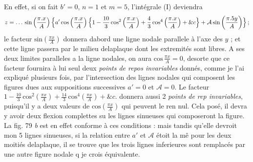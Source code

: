 \documentclass[11pt,a4paper]{article}
\begin{document}
En effet, si on fait $b'=0$, $n=1$ et $m=5$, l'intégrale (I) deviendra
\[
z=\ldots\,\text{sin}\left(\frac{\pi.x}{A}\right)\Bigl\{a'\,\text{cos}\left(\frac{\pi.x}{A}\right)\Bigl\{1-\frac{10}{3}\,\text{cos}^2\left(\frac{\pi.x}{A}\right)+\frac{4}{3}\,\text{cos}^4\left(\frac{\pi.x}{A}\right)+\&c\Bigr\}+\mathcal{A}\,\text{sin}\left(\frac{\pi.5y}{A}\right)\Bigr\}\,;
\]
le facteur $\text{sin}\left(\frac{\pi x}{A}\right)$ donnera dabord une ligne nodale parallele à l'axe
des $y$ ; et cette ligne passera par le milieu delaplaque dont les
extremités sont libres. A ses deux limites paralleles a la ligne nodales,
on aura $\text{cos}\,\frac{\pi x}{A}=0$, desorte que ce facteur fournira à lui seul
deux \emph{points de repos invariables} donnés, comme je l'ai expliqué
plusieurs fois, par l'intersection des lignes nodales qui composent
les figures dues aux suppositions successives $a'=0$ et $\mathcal{A}=0$. Le
facteur $1-\frac{10}{3}\,\text{cos}^2\left(\frac{\pi x}{A}\right)+\frac{14}{3}\,\text{cos}^4\left(\frac{\pi x}{A}\right)+\&c.$ donnera aussi 2 \emph{points de rep
invariables}, puisqu'il y a deux valeurs de $\text{cos}\left(\frac{\pi x}{A}\right)$ qui peuvent le ren
nul.
Cela posé, il devra y avoir deux flexion complettes su
les lignes sinueuses qui composeront la figure. La fig. 79 \emph{b} est
en effet conforme à ces conditions : mais tandis qu'elle devroit mon
5 lignes sinueuses, si la relation entre $a'$ et $\mathcal{A}$ étoit la mê
pour les deux moitiés delaplaque, il se trouve que les trois
lignes inferieures sont remplacés par une autre figure nodale q
je crois équivalente.
\end{document}
